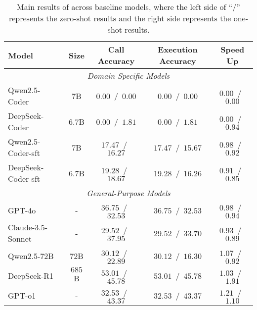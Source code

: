 

\begin{table*}[ht!] \small
    \centering
    \begin{tabular}{lcccc}
        \toprule
        \textbf{Model} & \textbf{Size} & \textbf{Call Accuracy} & \textbf{Execution Accuracy} & \textbf{Speed Up} \\ 
        \midrule
        \multicolumn{5}{c}{\textit{Domain-Specific Models}} \\
        Qwen2.5-Coder           & $7$B        & $0.00$~/~$0.00$                     & $0.00$~/~$0.00$                       & $0.00$~/~$0.00$     \\
        DeepSeek-Coder          & $6.7$B      & $0.00$~/~$1.81$                     & $0.00$~/~$1.81$                       & $0.00$~/~$\mathbf{0.94}$     \\
        Qwen2.5-Coder-sft      & $7$B        & $17.47$~/~$16.27$                    & $17.47$~/~$15.67$                     & $\mathbf{0.98}$~/~$0.92$     \\
        DeepSeek-Coder-sft     & $6.7$B      & $\mathbf{19.28}$~/~$\mathbf{18.67}$  & $\mathbf{19.28}$~/~$\mathbf{16.26}$   & $0.91$~/~$0.85$     \\

        \midrule
        \multicolumn{5}{c}{\textit{General-Purpose Models}} \\

        GPT-4o                      & -      &$36.75$~/~$32.53$                     &$36.75$~/~$32.53$                      & $0.98$~/~$0.94$     \\
        Claude-3.5-Sonnet           & -      &$29.52$~/~$37.95$                     &$29.52$~/~$33.70$                      & $0.93$~/~$0.89$     \\
        Qwen2.5-72B                 & 72B    &$30.12$~/~$22.89$                     &$30.12$~/~$16.30$                      & $1.07$~/~$0.92$     \\
        DeepSeek-R1                 &$685$B  &$\mathbf{53.01}$~/~$\mathbf{45.78}$   &$\mathbf{53.01}$~/~$\mathbf{45.78}$    & $1.03$~/~$\mathbf{1.91}$     \\
        GPT-o1                      & -      &$32.53$~/~$43.37$                     &$32.53$~/~$43.37$                      & $\mathbf{1.21}$~/~$1.10$     \\

        \bottomrule
    \end{tabular}
    \caption{Main results of \benchtwo across baseline models, where the left side of ``/'' represents the zero-shot results and the right side represents the one-shot results.}
    \label{tab:torch_res}
\end{table*}

